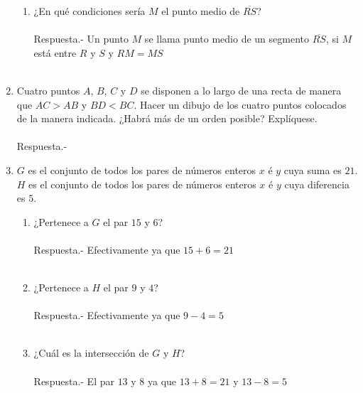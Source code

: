 \begin{enumerate}
\begin{enumerate}[\bfseries (a)]
\item ¿En qué condiciones sería $M$ el punto medio de $\overline{RS}$?\\\\
Respuesta.- \; Un punto $M$ se llama punto medio de un segmento $\overline{RS}$, si $M$ está entre $R$ y $S$ y $RM=MS$\\\\
\end{enumerate}

\item Cuatro puntos $A$, $B$, $C$ y $D$ se disponen a lo largo de una recta de manera que $AC>AB$ y $BD<BC$. Hacer un dibujo de los cuatro puntos colocados de la manera indicada. ¿Habrá más de un orden posible? Explíquese.\\\\
Respuesta.- \; 

\item $G$ es el conjunto de todos los pares de números enteros $x$ é $y$ cuya suma es $21$. $H$ es el conjunto de todos los pares de números enteros $x$ é $y$ cuya diferencia es $5$.
\begin{enumerate}[\bfseries (a)]
\item ¿Pertenece a $G$ el par $15$ y $6$?\\\\
Respuesta.- \; Efectivamente ya que $15+6=21$\\\\

\item ¿Pertenece a $H$ el par $9$ y $4$?\\\\
Respuesta.- \; Efectivamente ya que $9-4=5$\\\\

\item ¿Cuál es la intersección de $G$ y $H$?\\\\
Respuesta.- \; El par $13$ y $8$ ya que $13+8=21$ y $13-8=5$\\\\
\end{enumerate}


\end{enumerate}
